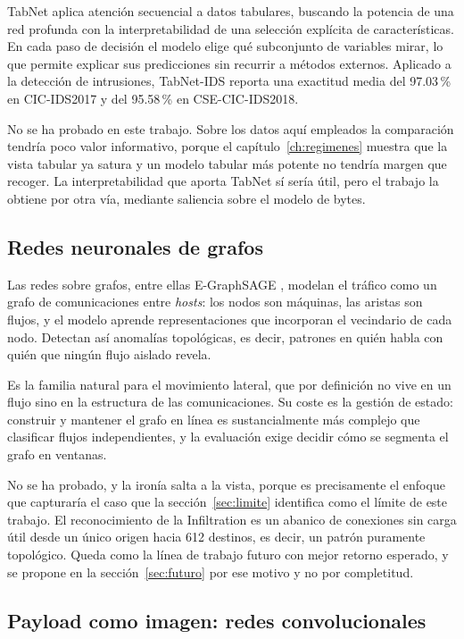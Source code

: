 TabNet \cite{Arik2021} aplica atención secuencial a datos tabulares, buscando la
potencia de una red profunda con la interpretabilidad de una selección explícita
de características. En cada paso de decisión el modelo elige qué subconjunto de
variables mirar, lo que permite explicar sus predicciones sin recurrir a métodos
externos. Aplicado a la detección de intrusiones, TabNet-IDS
\cite{Rodriguez2023} reporta una exactitud media del 97.03\,\% en CIC-IDS2017 y
del 95.58\,\% en CSE-CIC-IDS2018.

No se ha probado en este trabajo. Sobre los datos aquí empleados la comparación
tendría poco valor informativo, porque el capítulo~\ref{ch:regimenes} muestra que
la vista tabular ya satura y un modelo tabular más potente no tendría margen que
recoger. La interpretabilidad que aporta TabNet sí sería útil, pero el trabajo la
obtiene por otra vía, mediante saliencia sobre el modelo de bytes.

\subsection{Redes neuronales de grafos}

Las redes sobre grafos, entre ellas E-GraphSAGE \cite{Lo2022}, modelan el tráfico
como un grafo de comunicaciones entre \emph{hosts}: los nodos son máquinas, las
aristas son flujos, y el modelo aprende representaciones que incorporan el
vecindario de cada nodo. Detectan así anomalías topológicas, es decir, patrones
en quién habla con quién que ningún flujo aislado revela.

Es la familia natural para el movimiento lateral, que por definición no vive en
un flujo sino en la estructura de las comunicaciones. Su coste es la gestión de
estado: construir y mantener el grafo en línea es sustancialmente más complejo
que clasificar flujos independientes, y la evaluación exige decidir cómo se
segmenta el grafo en ventanas.

No se ha probado, y la ironía salta a la vista, porque es precisamente el enfoque
que capturaría el caso que la sección~\ref{sec:limite} identifica como el límite
de este trabajo. El reconocimiento de la Infiltration es un abanico de conexiones
sin carga útil desde un único origen hacia 612 destinos, es decir, un patrón
puramente topológico. Queda como la línea de trabajo futuro con mejor retorno
esperado, y se propone en la sección~\ref{sec:futuro} por ese motivo y no por
completitud.

\subsection{Payload como imagen: redes convolucionales}

